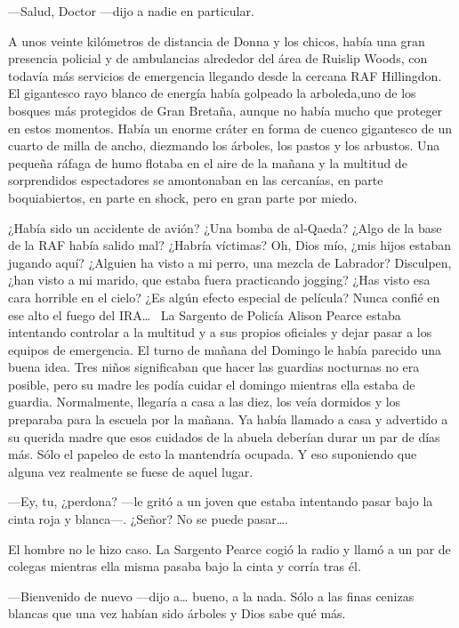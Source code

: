 ---Salud, Doctor ---dijo a nadie en particular.

A unos veinte kilómetros de distancia de Donna y los chicos, había una
gran presencia policial y de ambulancias alrededor del área de Ruislip
Woods, con todavía más servicios de emergencia llegando desde la cercana
RAF Hillingdon. El gigantesco rayo blanco de energía había golpeado la
arboleda,uno de los bosques más protegidos de Gran Bretaña, aunque no
había mucho que proteger en estos momentos. Había un enorme cráter en
forma de cuenco gigantesco de un cuarto de milla de ancho, diezmando los
árboles, los pastos y los arbustos. Una pequeña ráfaga de humo flotaba
en el aire de la mañana y la multitud de sorprendidos espectadores se
amontonaban en las cercanías, en parte boquiabiertos, en parte en shock,
pero en gran parte por miedo.

¿Había sido un accidente de avión? ¿Una bomba de al-Qaeda? ¿Algo de la
base de la RAF había salido mal? ¿Habría víctimas? Oh, Dios mío, ¿mis
hijos estaban jugando aquí? ¿Alguien ha visto a mi perro, una mezcla de
Labrador? Disculpen, ¿han visto a mi marido, que estaba fuera
practicando jogging? ¿Has visto esa cara horrible en el cielo? ¿Es
algún efecto especial de película? Nunca confié en ese alto el fuego
del IRA\ldots{}~ La Sargento de Policía Alison Pearce estaba intentando
controlar a la multitud y a sus propios oficiales y dejar pasar a los
equipos de emergencia. El turno de mañana del Domingo le había parecido
una buena idea. Tres niños significaban que hacer las guardias nocturnas
no era posible, pero su madre les podía cuidar el domingo mientras ella
estaba de guardia. Normalmente, llegaría a casa a las diez, los veía
dormidos y los preparaba para la escuela por la mañana. Ya había llamado
a casa y advertido a su querida madre que esos cuidados de la abuela
deberían durar un par de días más. Sólo el papeleo de esto la mantendría
ocupada. Y eso suponiendo que alguna vez realmente se fuese de aquel
lugar.

---Ey, tu, ¿perdona? ---le gritó a un joven que estaba intentando pasar
bajo la cinta roja y blanca---. ¿Señor? No se puede pasar\ldots{}.~

El hombre no le hizo caso. La Sargento Pearce cogió la radio y llamó a
un par de colegas mientras ella misma pasaba bajo la cinta y corría tras
él.

---Bienvenido de nuevo ---dijo a\ldots{} bueno, a la nada. Sólo a las
finas cenizas blancas que una vez habían sido árboles y Dios sabe qué
más.


